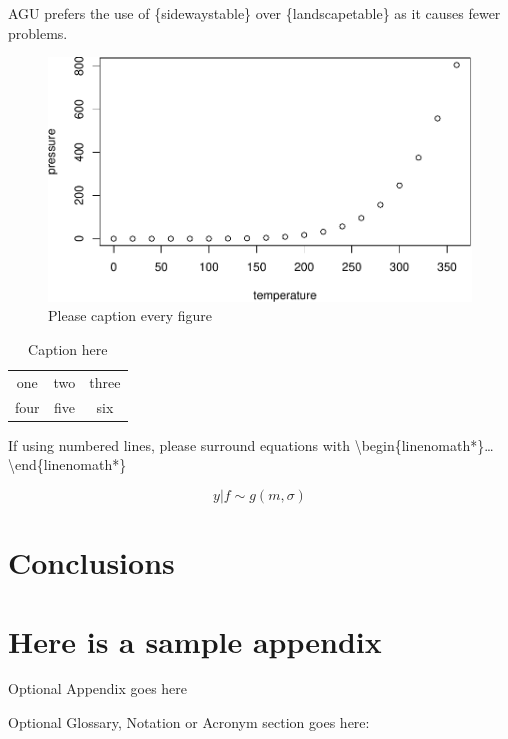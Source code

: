\documentclass[draft,linenumbers]{agujournal2018}
\begin{document}
AGU prefers the use of \{sidewaystable\} over \{landscapetable\} as it
causes fewer problems.

\begin{figure}
\includegraphics{article_template_agu_article_files/figure-latex/unnamed-chunk-3-1} \caption{Please caption every figure}\label{fig:unnamed-chunk-3}
\end{figure}

\begin{table}
\caption{Caption here}
\label{tab:signif_gap_clos}
\begin{tabular}{ccc}
one&two&three\\
four&five&six
\end{tabular}
\end{table}

If using numbered lines, please surround equations with
\textbackslash{}begin\{linenomath*\}\ldots{}
\textbackslash{}end\{linenomath*\}

\begin{linenomath*}
\begin{equation}
y|{f} \sim g(m, \sigma)
\end{equation}
\end{linenomath*}

\section{Conclusions}

\appendix
\section{Here is a sample appendix}

Optional Appendix goes here

Optional Glossary, Notation or Acronym section goes here:
\end{document}
